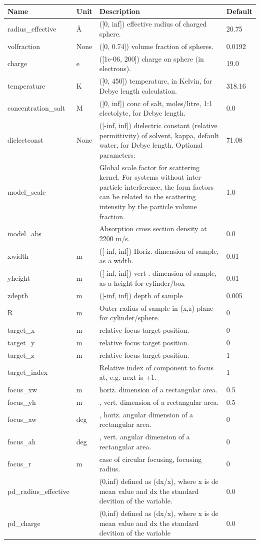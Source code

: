 \begin{longtable}{p{}p{}p{}p{}}
\toprule
\textbf{Name} & \textbf{Unit} & \textbf{Description} & \textbf{Default} \\
\midrule
\endhead
radius\_effective & \AA{} & ([0, inf]) effective radius of charged sphere. & 20.75 \\
volfraction & None & ([0, 0.74]) volume fraction of spheres. & 0.0192 \\
charge & e & ([1e-06, 200]) charge on sphere (in electrons). & 19.0 \\
temperature & K & ([0, 450]) temperature, in Kelvin, for Debye length calculation. & 318.16 \\
concentration\_salt & M & ([0, inf]) conc of salt, moles/litre, 1:1 electolyte, for Debye length. & 0.0 \\
dielectconst & None & ([-inf, inf]) dielectric constant (relative permittivity) of solvent, kappa, default water, for Debye length. Optional parameters: & 71.08 \\
model\_scale &   & Global scale factor for scattering kernel. For systems without inter-particle interference, the form factors can be related to the scattering intensity by the particle volume fraction. & 1.0 \\
model\_abs &   & Absorption cross section density at 2200 m/s. & 0.0 \\
xwidth & m & ([-inf, inf]) Horiz. dimension of sample, as a width. & 0.01 \\
yheight & m & ([-inf, inf]) vert . dimension of sample, as a height for cylinder/box & 0.01 \\
zdepth & m & ([-inf, inf]) depth of sample & 0.005 \\
R & m & Outer radius of sample in (x,z) plane for cylinder/sphere. & 0 \\
target\_x & m & relative focus target position. & 0 \\
target\_y & m & relative focus target position. & 0 \\
target\_z & m & relative focus target position. & 1 \\
target\_index &   & Relative index of component to focus at, e.g. next is +1. & 1 \\
focus\_xw & m & horiz. dimension of a rectangular area. & 0.5 \\
focus\_yh & m & , vert. dimension of a rectangular area. & 0.5 \\
focus\_aw & deg & , horiz. angular dimension of a rectangular area. & 0 \\
focus\_ah & deg & , vert. angular dimension of a rectangular area. & 0 \\
focus\_r & m & case of circular focusing, focusing radius. & 0 \\
pd\_radius\_effective &  & (0,inf) defined as (dx/x), where x is de mean value and dx the standard devition of the variable. & 0.0 \\
pd\_charge &  & (0,inf) defined as (dx/x), where x is de mean value and dx the standard devition of the variable & 0.0 \\
\bottomrule
\end{longtable}


